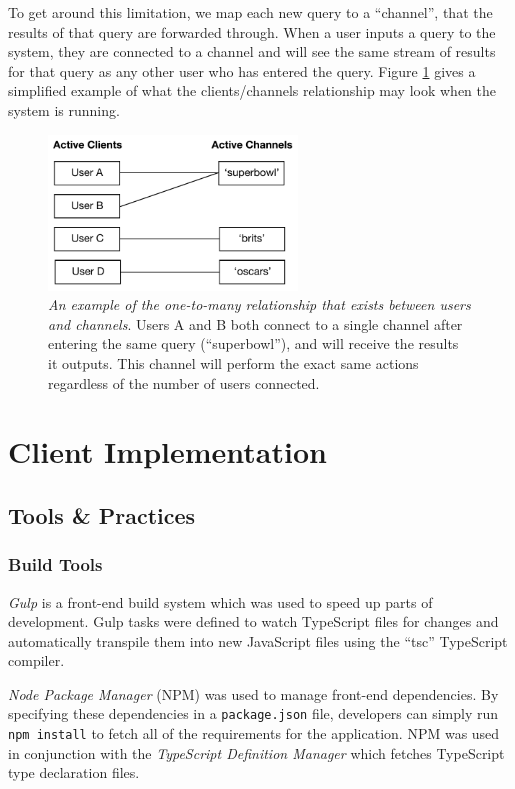 \documentclass{l4proj}
\newcommand{\code}[1]{\texttt{#1}}
\begin{document}
        To get around this limitation, we map each new query to a ``channel'', that the results of that query are forwarded through. When a user inputs a query to the system, they are connected to a channel and will see the same stream of results for that query as any other user who has entered the query. Figure \ref{channels} gives a simplified example of what the clients/channels relationship may look when the system is running.
        
\begin{figure}
\centering
\includegraphics[width=250px, height=156px]{channels.pdf}
\caption{\textit{An example of the one-to-many relationship that exists between users and channels}. Users A and B both connect to a single channel after entering the same query (``superbowl''), and will receive the results it outputs. This channel will perform the exact same actions regardless of the number of users connected.}
\label{channels}
\end{figure}        
                          
\section{Client Implementation}
        \subsection{Tools \& Practices}

        \subsubsection{Build Tools}
        \textit{Gulp} is a front-end build system which was used to speed up parts of development. Gulp tasks were defined to watch TypeScript files for changes and automatically transpile them into new JavaScript files using the ``tsc'' TypeScript compiler.
        
        \textit{Node Package Manager} (NPM) was used to manage front-end dependencies. By specifying these dependencies in a \code{package.json} file, developers can simply run \code{npm install} to fetch all of the requirements for the application. NPM was used in conjunction with the \textit{TypeScript Definition Manager} which fetches TypeScript type declaration files.
\end{document}
